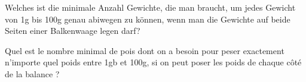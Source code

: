 Welches ist die minimale Anzahl Gewichte, die man braucht, um jedes Gewicht von 1g bis 100g genau abiwegen zu können, wenn man die Gewichte auf beide Seiten einer Balkenwaage legen darf?

\bigskip

Quel est le nombre minimal de pois dont on a besoin pour peser exactement n'importe quel poids entre 1gb et 100g, si on peut poser les poids de chaque côté de la balance ?